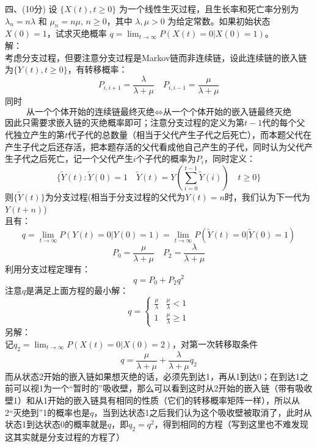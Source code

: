 \documentclass[UTF8,openany]{book}
\begin{document}
\noindent 四、(10分) 设 $\{X(t), t \geq 0\}$ 为一个线性生灭过程，且生长率和死亡率分别为 $\lambda_n = n\lambda$ 和 $\mu_n = n\mu$, $n \geq 0$，其中 $\lambda, \mu > 0$ 为给定常数。如果初始状态 $X(0) = 1$，试求灭绝概率 $q= \lim_{t \to \infty} P(X(t) = 0|X(0) = 1)$。\\
解：\\
考虑分支过程，但要注意分支过程是Markov链而非连续链，设此连续链的嵌入链为$\{Y(t), t \geq 0\}$，有转移概率：\\
\[
P_{i,i+1}=\frac{\lambda}{\lambda+\mu} \quad P_{i,i-1}=\frac{\mu}{\lambda+\mu}
\]
同时
\[
\text{从一个个体开始的连续链最终灭绝} \iff \text{从一个个体开始的嵌入链最终灭绝}
\]
因此只需要求嵌入链的灭绝概率即可；注意分支过程的定义为第$t-1$代的每个父代独立产生的第$t$代子代的总数量（相当于父代产生子代之后死亡），而本题父代在产生子代之后还存活，把本题存活的父代看成他自己产生的子代，同时认为父代产生子代之后死亡，记一个父代产生$i$个子代的概率为$P_i$，同时定义：\\
\[
\{\tilde{Y}(t):\tilde{Y}(0)=1\quad \tilde{Y}(t)=Y\left(\sum\limits_{i=0}^{t-1}  \tilde{Y}(i) \right)  \quad t \geq 0\}
\]
则$\{\tilde{Y}(t) \}$为分支过程(相当于分支过程的父代为$Y(t)=n$时，我们认为下一代为$Y(t+n)$)\\
且有：
\[
q= \lim_{t \to \infty} P(Y(t) = 0|Y(0) = 1)= \lim_{t \to \infty} P(\tilde{Y}(t) = 0|\tilde{Y}(0) = 1)
\]
\[
P_0=\frac{\mu}{\lambda+\mu} \quad P_2=\frac{\lambda}{\lambda+\mu}
\]
利用分支过程定理有：
\[
q=P_0+P_2q^2
\]
注意$q$是满足上面方程的最小解：
\[
q=
\begin{cases}
	\frac{\mu}{\lambda}  & \frac{\mu}{\lambda}<1  \\
	1  &  \frac{\mu}{\lambda}\ge 1
\end{cases}
\]
另解：\\
记$q_2=\lim_{t \to \infty} P(X(t) = 0|X(0) = 2)$，对第一次转移取条件\\
\[
q=\frac{\mu}{\lambda+\mu}+\frac{\lambda}{\lambda+\mu}q_2
\]
而从状态2开始的嵌入链如果想灭绝的话，必须先到达1，再从1到达0；在到达1之前可以视1为一个“暂时的”吸收壁，那么可以看到这时从2开始的嵌入链（带有吸收壁1）和从1开始的嵌入链具有相同的性质（它们的转移概率矩阵一样），所以从2“灭绝到”1的概率也是$q$，当到达状态1之后我们认为这个吸收壁被取消了，此时从状态1到达状态0的概率就是$q$，即$q_2=q^2$，得到相同的方程（写到这里也不难发现这其实就是分支过程的方程了）\\
\end{document}
